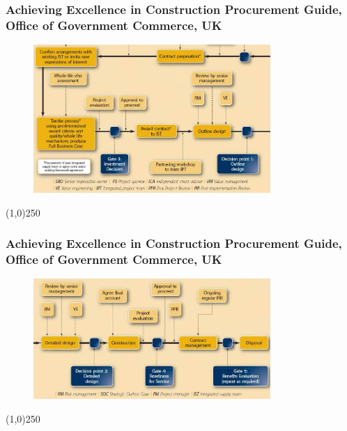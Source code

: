 \begin{frame}
\frametitle{Achieving Excellence in Construction Procurement Guide, Office of Government Commerce, UK}
 \begin{figure}
 	\centering
 		\includegraphics[width = 9cm]{images/life6.jpg}
 	\label{fig:UKlife6}
 \end{figure}
\end{frame}
\begin{center}\line(1,0){250}\end{center}



\begin{frame}
\frametitle{Achieving Excellence in Construction Procurement Guide, Office of Government Commerce, UK}
 \begin{figure}
 	\centering
 		\includegraphics[width = 9cm]{images/life7.jpg}
 	\label{fig:UKlife7}
 \end{figure}
\end{frame}
\begin{center}\line(1,0){250}\end{center}




